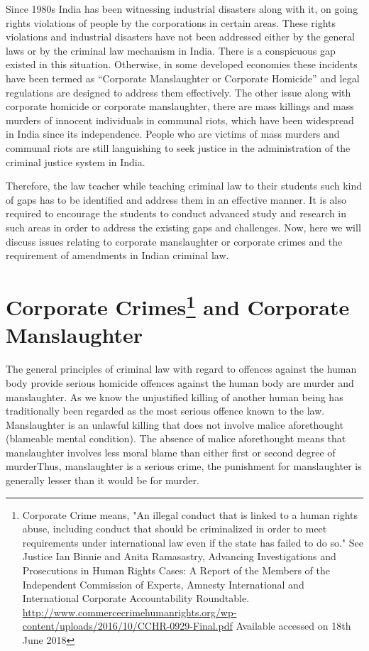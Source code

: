 \begin{multicols}{2}
\noi
Since 1980s India has been witnessing industrial disasters along with it, on going
rights violations of people by the corporations in certain areas. These rights violations
and industrial disasters have not been addressed either by the general laws or by the
criminal law mechanism in India. There is a conspicuous gap existed in this situation.
Otherwise, in some developed economies these incidents have been termed as
“Corporate Manslaughter or Corporate Homicide” and legal regulations are designed
to address them effectively. The other issue along with corporate homicide or
corporate manslaughter, there are mass killings and mass murders of innocent
individuals in communal riots, which have been widespread in India since its 
independence. People who are victims of mass murders and communal riots are still
languishing to seek justice in the administration of the criminal justice system in
India.

\noi
Therefore, the law teacher while teaching criminal law to their students such kind of
gaps has to be identified and address them in an effective manner. It is also required
to encourage the students to conduct advanced study and research in such areas in
order to address the existing gaps and challenges. Now, here we will discuss issues
relating to corporate manslaughter or corporate crimes and the requirement of
amendments in Indian criminal law.

\vspace{-.3cm}

\section{Corporate Crimes\protect\footnote{Corporate Crime means, "An illegal conduct that is linked to a human rights abuse, including conduct
that should be criminalized in order to meet requirements under international law even if the state has
failed to do so." See Justice Ian Binnie and Anita Ramasastry, Advancing Investigations and
Prosecutions in Human Rights Cases: A Report of the Members of the Independent Commission of
Experts, Amnesty International and International Corporate Accountability Roundtable. \protect\url{http://www.commercecrimehumanrights.org/wp-content/uploads/2016/10/CCHR-0929-Final.pdf} Available accessed on 18th June 2018} and Corporate\\ Manslaughter}\label{section-3}

\vspace{-.2cm}

\noi
The general principles of criminal law with regard to offences against the human body
provide serious homicide offences against the human body are murder and
manslaughter. As we know the unjustified killing of another human being has
traditionally been regarded as the most serious offence known to the law.
Manslaughter is an unlawful killing that does not involve malice aforethought
(blameable mental condition). The absence of malice aforethought means that
manslaughter involves less moral blame than either first or second degree of
murderThus, manslaughter is a serious crime, the punishment for manslaughter is
generally lesser than it would be for murder.


\end{multicols}
